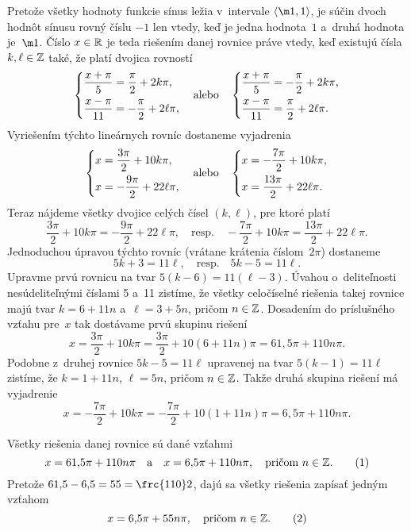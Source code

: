 {%
Pretože všetky hodnoty funkcie sínus ležia v~intervale
$\langle{\m1},1\rangle$, je súčin dvoch hodnôt sínusu rovný číslu
$-1$ len vtedy, keď je jedna hodnota~$1$ a~druhá hodnota je~$\m1$.
Číslo $x\in\Bbb R$ je teda riešením danej rovnice práve vtedy, keď
existujú čísla $k,\ell\in\Bbb Z$ také, že platí dvojica rovností
$$
\left\{\aligned
\frac{x+\pi}{5}&=\frac{\pi}{2}+2k\pi,\\
\frac{x-\pi}{11}&=-\frac{\pi}{2}+2\ell\pi,
\endaligned\right.\quad\text{alebo}\quad
\left\{\aligned
\frac{x+\pi}{5}&=-\frac{\pi}{2}+2k\pi,\\
\frac{x-\pi}{11}&=\frac{\pi}{2}+2\ell\pi.
\endaligned\right.
$$
Vyriešením týchto lineárnych rovníc dostaneme vyjadrenia
$$
\left\{\aligned
x&=\frac{3\pi}{2}+10k\pi,\\
x&=-\frac{9\pi}{2}+22\ell\pi,
\endaligned\right.\quad\text{alebo}\quad
\left\{\aligned
x&=-\frac{7\pi}{2}+10k\pi,\\
x&=\frac{13\pi}{2}+22\ell\pi.
\endaligned\right.
$$
Teraz nájdeme všetky dvojice celých čísel $(k,\ell)$, pre ktoré platí
$$
\frac{3\pi}{2}+10k\pi=-\frac{9\pi}{2}+22\ell\pi,\quad
\text{resp.}\quad
-\frac{7\pi}{2}+10k\pi=\frac{13\pi}{2}+22\ell\pi.
$$
Jednoduchou úpravou týchto rovníc (vrátane krátenia číslom~$2\pi$)
dostaneme
$$
5k+3=11\ell,\quad\text{resp.}\quad
5k-5=11\ell.
$$
Upravme prvú rovnicu na tvar $5(k-6)=11(\ell-3)$. Úvahou
o~deliteľnosti nesúdeliteľnými číslami 5 a~11 zistíme, že všetky
celočíselné riešenia takej rovnice majú tvar $k=6+11n$ 
a~$\ell=3+5n$, pričom $n\in\Bbb Z$. Dosadením do príslušného vzťahu
pre~$x$ tak dostávame prvú skupinu riešení
$$
x=\frac{3\pi}{2}+10k\pi=\frac{3\pi}{2}+10(6+11n)\pi=61{,}5\pi+110n\pi.
$$
Podobne z~druhej rovnice $5k-5=11\ell$ upravenej na tvar $5(k-1)=11\ell$
zistíme, že $k=1+11n$, $\ell=5n$, pričom $n\in\Bbb Z$. Takže
druhá skupina riešení má vyjadrenie
$$
x=-\frac{7\pi}{2}+10k\pi=-\frac{7\pi}{2}+10(1+11n)\pi=
6{,}5\pi+110n\pi.
$$

\zaver Všetky riešenia danej rovnice sú dané vzťahmi
$$
x=61{,}5\pi+110n\pi\quad\text{a}\quad
x=6{,}5\pi+110n\pi,\quad\text{pričom }n\in\Bbb Z.     \tag1
$$
Pretože $61{,}5-6{,}5=55=\frc{110}2$, dajú sa všetky riešenia zapísať jedným
vzťahom
$$
x=6{,}5\pi+55n\pi,\quad\text{pričom }n\in\Bbb Z.      \tag2
$$

}
